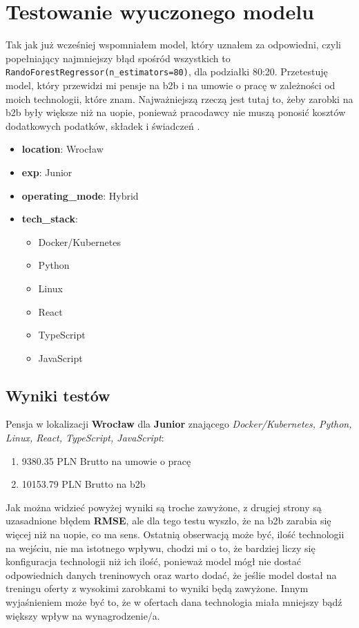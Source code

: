 \documentclass[a4paper]{article}
\begin{document}
\section{Testowanie wyuczonego modelu}

\quad Tak jak już wcześniej wspomniałem model, który uznałem za odpowiedni, czyli popełniający najmniejszy błąd
spośród wszystkich to \texttt{RandoForestRegressor(n\_estimators=80)}, dla podziałki 80:20.
Przetestuję model, który przewidzi mi pensje na b2b i na umowie o pracę w zależności od
moich technologii, które znam. Najważniejszą rzeczą jest tutaj to, żeby zarobki na b2b były większe niż na uopie,
ponieważ pracodawcy nie muszą ponosić kosztów dodatkowych podatków, składek i świadczeń \cite{uop_vs_b2b}.

\begin{itemize}
    \item \textbf{location}: Wrocław
    \item \textbf{exp}: Junior
    \item \textbf{operating\_mode}: Hybrid
    \item \textbf{tech\_stack}:
          \begin{itemize}
              \item Docker/Kubernetes
              \item Python
              \item Linux
              \item React
              \item TypeScript
              \item JavaScript
          \end{itemize}
\end{itemize}

\subsection{Wyniki testów}

\quad Pensja w lokalizacji \textbf{Wrocław} dla \textbf{Junior} znającego \textit{Docker/Kubernetes, Python, Linux, React, TypeScript, JavaScript}:

\begin{enumerate}
    \item 9380.35 PLN Brutto na umowie o pracę
    \item 10153.79 PLN Brutto na b2b
\end{enumerate}

\quad Jak można widzieć powyżej wyniki są troche zawyżone, z drugiej strony są uzasadnione błędem \textbf{RMSE}, ale dla tego testu wyszło, że na b2b
zarabia się więcej niż na uopie, co ma sens. Ostatnią obserwacją może być, ilość technologii na wejściu, nie ma istotnego wpływu,
chodzi mi o to, że bardziej liczy się konfiguracja technologii niż ich ilość, ponieważ model mógł nie dostać odpowiednich danych treninowych oraz warto dodać, że jeślie model dostał na treningu oferty
z wysokimi zarobkami to wyniki będą zawyżone. Innym wyjaśnieniem może być to, że w ofertach dana technologia miała mniejszy bądź większy wpływ na wynagrodzenie/a.
\end{document}
